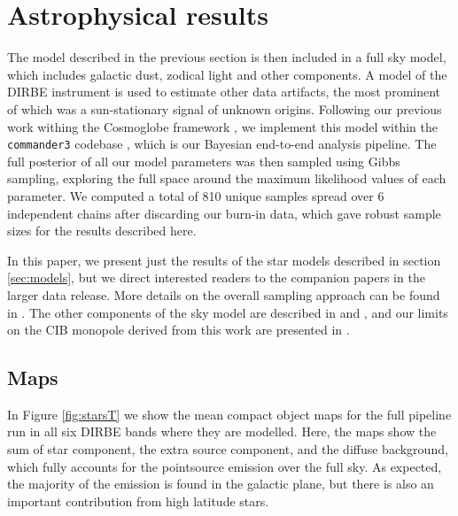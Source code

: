 \documentclass{aa}
\begin{document}
\section{Astrophysical results}
\label{sec:results}

The model described in the previous section is then included in a full sky model, which includes galactic dust, zodical light and other components. A model of the DIRBE instrument is used to estimate other data artifacts, the most prominent of which was a sun-stationary signal of unknown origins. Following our previous work withing the Cosmoglobe framework \citep{BP01, watts2023_dr1}, we implement this model within the \texttt{commander3} codebase \citep{BP03}, which is our Bayesian end-to-end analysis pipeline. The full posterior of all our model parameters was then sampled using Gibbs sampling, exploring the full space around the maximum likelihood values of each parameter. We computed a total of 810 unique samples spread over 6 independent chains after discarding our burn-in data, which gave robust sample sizes for the results described here. 

In this paper, we present just the results of the star models described in section \ref{sec:models}, but we direct interested readers to the companion papers in the larger data release. More details on the overall sampling approach can be found in \citet{CG02_01}. The other components of the sky model are described in \citet{CG02_02} and \citet{CG02_05}, and our limits on the CIB monopole derived from this work are presented in \citet{CG02_03}. 


\subsection{Maps}

In Figure \ref{fig:starsT} we show the mean compact object maps for the full pipeline run in all six DIRBE bands where they are modelled. Here, the maps show the sum of star component, the extra source component, and the diffuse background, which fully accounts for the pointsource emission over the full sky. As expected, the majority of the emission is found in the galactic plane, but there is also an important contribution from high latitude stars.
\end{document}
